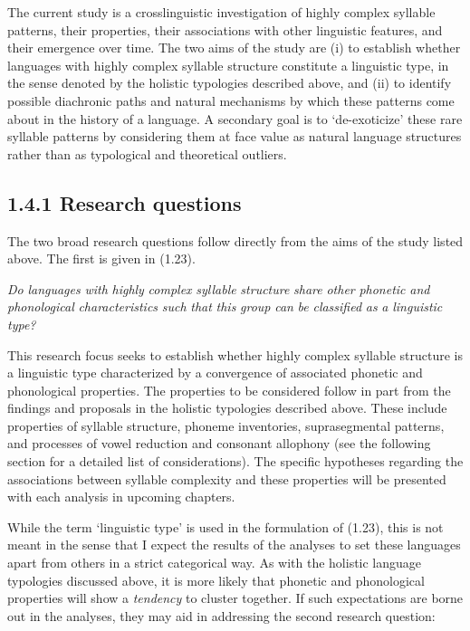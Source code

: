   The current study is a crosslinguistic investigation of highly complex syllable patterns, their properties, their associations with other linguistic features, and their emergence over time. The two aims of the study are (i) to establish whether languages with highly complex syllable structure constitute a linguistic type, in the sense denoted by the holistic typologies described above, and (ii) to identify possible diachronic paths and natural mechanisms by which these patterns come about in the history of a language. A secondary goal is to ‘de-exoticize’ these rare syllable patterns by considering them at face value as natural language structures rather than as typological and theoretical outliers.


\subsection{1.4.1 Research questions}

  The two broad research questions follow directly from the aims of the study listed above. The first is given in (1.23).



\ea\label{ex:(1.23)}
   \textit{Do} \textit{languages} \textit{with} \textit{highly} \textit{complex} \textit{syllable} \textit{structure} \textit{share} \textit{other} \textit{phonetic} \textit{and} \textit{phonological} \textit{characteristics} \textit{such} \textit{that} \textit{this} \textit{group} \textit{can} \textit{be} \textit{classified} \textit{as} \textit{a} \textit{linguistic} \textit{type?}
\z



  This research focus seeks to establish whether highly complex syllable structure is a linguistic type characterized by a convergence of associated phonetic and phonological properties. The properties to be considered follow in part from the findings and proposals in the holistic typologies described above. These include properties of syllable structure, phoneme inventories, suprasegmental patterns, and processes of vowel reduction and consonant allophony (see the following section for a detailed list of considerations). The specific hypotheses regarding the associations between syllable complexity and these properties will be presented with each analysis in upcoming chapters.



  While the term ‘linguistic type’ is used in the formulation of (1.23), this is not meant in the sense that I expect the results of the analyses to set these languages apart from others in a strict categorical way. As with the holistic language typologies discussed above, it is more likely that phonetic and phonological properties will show a \textit{tendency} to cluster together. If such expectations are borne out in the analyses, they may aid in addressing the second research question:



